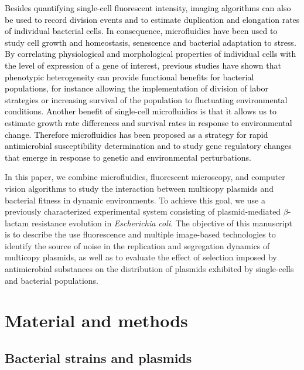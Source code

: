 \documentclass[fleqn,12pt]{wlscirep}
\newcommand{\blue}[1]{\textcolor{black}{#1}}
\begin{document}
\blue{Besides quantifying single-cell fluorescent intensity, imaging algorithms can also be used to record division events and to estimate duplication and elongation rates of individual bacterial cells.  In consequence, microfluidics have been used to study cell growth and homeostasis\cite{wallden2016synchronization}, senescence\cite{ackermann2003senescence,lindner2008asymmetric} and bacterial adaptation to stress\cite{lapinska2019bacterial,mathis2016response,patange2018escherichia}. By correlating physiological and morphological properties of individual cells with the level of expression of a gene of interest, previous studies have shown that phenotypic heterogeneity can provide functional benefits for bacterial populations, for instance allowing the implementation of division of labor strategies or increasing survival of the population to fluctuating environmental conditions\cite{Ackermann2015}.
Another benefit of single-cell microfluidics is that it allows us to estimate growth rate differences and survival rates in response to environmental change.  Therefore microfluidics has been proposed as a strategy for rapid antimicrobial susceptibility determination \cite{Baltekin2017,Aroonnual2017} and to study gene regulatory changes that emerge in response to genetic and environmental perturbations\cite{rochman2016grow,chait2017shaping}.   }

In this paper, we combine microfluidics, fluorescent microscopy, and computer vision algorithms to study the interaction between multicopy plasmids and bacterial fitness in dynamic environments. To achieve this goal, we use a previously characterized experimental system consisting of plasmid-mediated $\beta$-lactam resistance evolution in {\em Escherichia coli}\cite{Rodriguez2018}. The objective of this manuscript is to describe the use fluorescence and multiple image-based technologies to identify the source of noise in the replication and segregation dynamics of multicopy plasmids, as well as to evaluate the effect of selection imposed by antimicrobial substances on the distribution of plasmids exhibited by single-cells and bacterial populations.
 
\section{Material and methods}

\subsection{Bacterial strains and plasmids}
\end{document}
